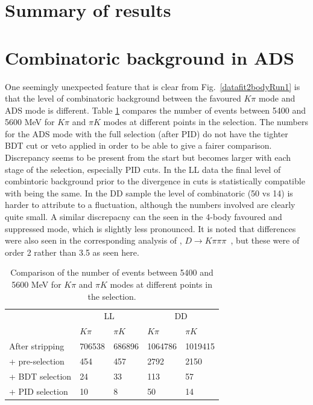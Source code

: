 \section{Summary of results}
\label{sec:cpfit:summary}

\section{Combinatoric background in ADS}
\label{sec:cpfit:comb}

One seemingly unexpected feature that is clear from Fig.~\ref{datafit2bodyRun1} is that the level of combinatoric background between the favoured $K\pi$ mode and ADS mode is different. Table \ref{adscombinatoric} compares the number of events between 5400 and 5600 MeV for $K\pi$ and $\pi K$ modes at different points in the selection. The numbers for the ADS mode with the full selection (after PID) do not have the tighter BDT cut or veto applied in order to be able to give a fairer comparison. Discrepancy seems to be present from the start but becomes larger with each stage of the selection, especially PID cuts. In the LL data the final level of combintoric background prior to the divergence in cuts is statistically compatible with being the same. In the DD sample the level of combinatoric (50 vs 14) is harder to attribute to a fluctuation, although the numbers involved are clearly quite small. A similar discrepacny can the seen in the 4-body favoured and suppressed mode, which is slightly less pronounced. It is noted that differences were also seen in the corresponding analysis of \decay{\Bm}{\D\Km}, $D\to K\pi\pi\pi$~\cite{LHCb-PAPER-2016-003}, but these were of order 2 rather than 3.5 as seen here. 

\begin{table}[h]
\centering
\begin{tabular}{l|ll|ll}
\hline
& \multicolumn{2}{c}{LL} & \multicolumn{2}{c}{DD} \\
& $K\pi$ & $\pi K$ & $K\pi$ & $\pi K$ \\
\hline
After stripping & 706538 & 686896 & 1064786 & 1019415 \\
+ pre-selection & 454 & 457 & 2792 & 2150 \\
+ BDT selection & 24 & 33 & 113 & 57 \\
+ PID selection & 10 & 8 & 50 & 14 \\
\hline
\end{tabular}
\caption{Comparison of the number of events between 5400 and 5600 MeV for $K\pi$ and $\pi K$ modes at different points in the selection.}
\label{adscombinatoric}
\end{table}

